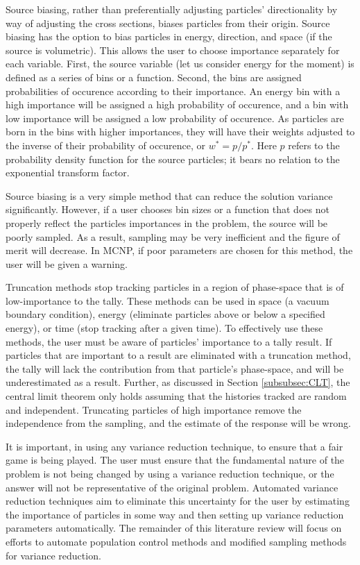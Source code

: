 Source biasing, rather than preferentially adjusting particles' directionality
by way of adjusting the cross sections, biases particles from their origin.
Source biasing has the option to bias particles in energy, direction, and space
(if the source is volumetric). This allows the user to choose importance
separately for each variable. First, the source variable (let us consider
energy for the moment) is defined as a series of bins or a function. Second, the bins are
assigned probabilities of occurence according to their importance. An energy bin
with a high importance will be assigned a high probability of occurence, and a
bin with low importance will be assigned a low probability of occurence. As
particles are born in the bins with higher importances, they will have their
weights adjusted to the inverse of their probability of occurence, or $w^* =
p/p^*$. Here $p$ refers to the probability density function for the source
particles; it bears no relation to the exponential transform factor.

Source biasing is a very simple method that can reduce the solution variance
significantly. However, if a user chooses bin sizes or a function that does not
properly reflect the particles importances in the problem, the source will be
poorly sampled. As a result, sampling may be very inefficient and the figure of
merit will decrease. In MCNP, if poor parameters are chosen for this method, the
user will be given a warning.

Truncation methods stop tracking particles in a region of phase-space that is of
low-importance to the tally. These methods can be used in space (a vacuum boundary
condition), energy (eliminate particles above or below a specified energy), or
time (stop
tracking after a given time). To effectively use these methods, the user must be
aware of
particles' importance to a tally result. If particles that are important to a
result are
 eliminated with a truncation method, the tally will lack the contribution from
 that particle's phase-space, and will be underestimated as a result. Further,
 as discussed in Section \ref{subsubsec:CLT}, the central limit theorem only
 holds assuming that the histories tracked are random and independent.
 Truncating particles of high importance remove the independence from the
 sampling, and the estimate of the response will be wrong.

It is important, in using any variance reduction technique, to ensure that a
fair game
is being played. The user must ensure that the fundamental nature of the problem
is not
being changed by using a variance reduction technique, or the answer will not be
representative of the original problem. Automated variance reduction techniques aim to
eliminate this uncertainty for the user by estimating the importance of
particles in some
 way and then setting up variance reduction parameters automatically.
The remainder of this literature review will focus on efforts to
automate population
control methods and modified sampling methods for variance reduction.


